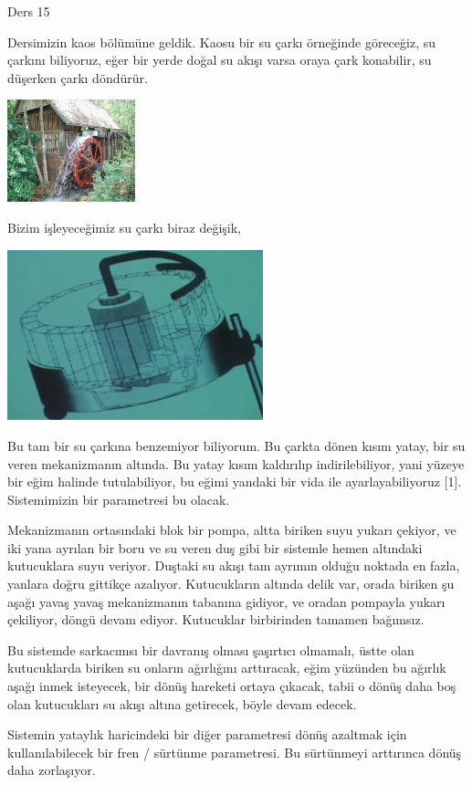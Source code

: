 \documentclass[12pt,fleqn]{article}\usepackage{../../common}
\begin{document}
Ders 15

Dersimizin kaos bölümüne geldik. Kaosu bir su çarkı örneğinde göreceğiz, su
çarkını biliyoruz, eğer bir yerde doğal su akışı varsa oraya çark
konabilir, su düşerken çarkı döndürür.

\includegraphics[width=10em]{waterwheel.jpg}

Bizim işleyeceğimiz su çarkı biraz değişik,

\includegraphics[width=20em]{15_01.jpg}

Bu tam bir su çarkına benzemiyor biliyorum. Bu çarkta dönen kısım yatay,
bir su veren mekanizmanın altında. Bu yatay kısım kaldırılıp
indirilebiliyor, yani yüzeye bir eğim halinde tutulabiliyor, bu eğimi
yandaki bir vida ile ayarlayabiliyoruz [1]. Sistemimizin bir parametresi bu
olacak.

Mekanizmanın ortasındaki blok bir pompa, altta biriken suyu yukarı çekiyor,
ve iki yana ayrılan bir boru ve su veren duş gibi bir sistemle hemen
altındaki kutucuklara suyu veriyor. Duştaki su akışı tam ayrımın olduğu
noktada en fazla, yanlara doğru gittikçe azalıyor. Kutucukların altında
delik var, orada biriken şu aşağı yavaş yavaş mekanizmanın tabanına
gidiyor, ve oradan pompayla yukarı çekiliyor, döngü devam
ediyor. Kutucuklar birbirinden tamamen bağımsız.

Bu sistemde sarkacımsı bir davranış olması şaşırtıcı olmamalı, üstte olan
kutucuklarda biriken su onların ağırlığını arttıracak, eğim yüzünden bu
ağırlık aşağı inmek isteyecek, bir dönüş hareketi ortaya çıkacak, tabii o
dönüş daha boş olan kutucukları su akışı altına getirecek, böyle devam
edecek.

Sistemin yataylık haricindeki bir diğer parametresi dönüş azaltmak için
kullanılabilecek bir fren / sürtünme parametresi. Bu sürtünmeyi arttırınca
dönüş daha zorlaşıyor. 
\end{document}
